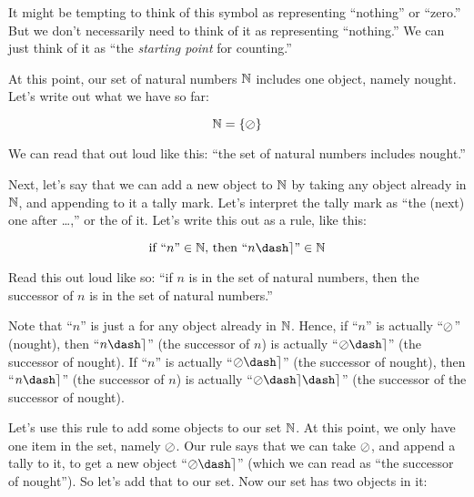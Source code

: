 \documentclass[../../../main.tex]{subfiles}
\begin{document}
It might be tempting to think of this symbol as representing ``nothing'' or ``zero.'' But we don't necessarily need to think of it as representing ``nothing.'' We can just think of it as ``the \emph{starting point} for counting.'' 

At this point, our set of natural numbers $\Nats/$ includes one object, namely nought. Let's write out what we have so far:

\begin{equation*}
  \Nats/ = \{ \nought/ \}
\end{equation*}

We can read that out loud like this: ``the set of natural numbers includes nought.''

Next, let's say that we can add a new object to $\Nats/$ by taking any object already in $\Nats/$, and appending to it a tally mark. Let's interpret the tally mark as ``the (next) one after \ldots,'' or the  of it. Let's write this out as a rule, like this:

\begin{equation*}
  \text{if ``$n$''} \in \Nats/ \text{, then ``$n\dash\tally/$''} \in \Nats/
\end{equation*}

Read this out loud like so: ``if $n$ is in the set of natural numbers, then the successor of $n$ is in the set of natural numbers.'' 

\begin{aside}
  \begin{remark}
    Note that ``$n$'' is just a  for any object already in $\Nats/$. Hence, if ``$n$'' is actually ``$\nought/$'' (nought), then ``$n\dash\tally/$'' (the successor of $n$) is actually ``$\nought/\dash\tally/$'' (the successor of nought). If ``$n$'' is actually ``$\nought/\dash\tally/$'' (the successor of nought), then ``$n\dash\tally/$'' (the successor of $n$) is actually ``$\nought/\dash\tally/\dash\tally/$'' (the successor of the successor of nought).
  \end{remark}
\end{aside}


Let's use this rule to add some objects to our set $\Nats/$. At this point, we only have one item in the set, namely $\nought/$. Our rule says that we can take $\nought/$, and append a tally to it, to get a new object ``$\nought/\dash\tally/$'' (which we can read as ``the successor of nought''). So let's add that to our set. Now our set has two objects in it:
\end{document}

